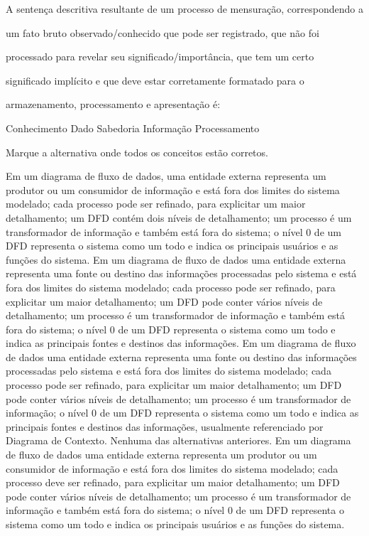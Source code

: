 \documentclass[12pt, addpoints]{exam}
\begin{document}
\begin{questions}
\question

A sentença descritiva resultante de um processo de mensuração, correspondendo a

um fato bruto observado/conhecido que pode ser registrado, que não foi

processado para revelar seu significado/importância, que tem um certo

significado implícito e que deve estar corretamente formatado para o

armazenamento, processamento e apresentação é:
\begin{choices}
\choice Conhecimento
\choice Dado
\choice Sabedoria
\choice Informação
\choice Processamento
\end{choices}

\question

Marque a alternativa onde todos os conceitos estão corretos.


\begin{choices}
\choice Em um diagrama de fluxo de dados, uma entidade externa representa um produtor ou um consumidor de informação e está fora dos limites do sistema modelado; cada processo pode ser refinado, para explicitar um maior detalhamento; um DFD contém dois níveis de detalhamento; um processo é um transformador de informação e também está fora do sistema; o nível 0 de um DFD representa o sistema como um todo e indica os principais usuários e as funções do sistema.
\choice Em um diagrama de fluxo de dados uma entidade externa representa uma fonte ou destino das informações processadas pelo sistema e está fora dos limites do sistema modelado; cada processo pode ser refinado, para explicitar um maior detalhamento; um DFD pode conter vários níveis de detalhamento; um processo é um transformador de informação e também está fora do sistema; o nível 0 de um DFD representa o sistema como um todo e indica as principais fontes e destinos das informações.
\choice Em um diagrama de fluxo de dados uma entidade externa representa uma fonte ou destino das informações processadas pelo sistema e está fora dos limites do sistema modelado; cada processo pode ser refinado, para explicitar um maior detalhamento; um DFD pode conter vários níveis de detalhamento; um processo é um transformador de informação; o nível 0 de um DFD representa o sistema como um todo e indica as principais fontes e destinos das informações, usualmente referenciado por Diagrama de Contexto.
\choice Nenhuma das alternativas anteriores.
\choice Em um diagrama de fluxo de dados uma entidade externa representa um produtor ou um consumidor de informação e está fora dos limites do sistema modelado; cada processo deve ser refinado, para explicitar um maior detalhamento; um DFD pode conter vários níveis de detalhamento; um processo é um transformador de informação e também está fora do sistema; o nível 0 de um DFD representa o sistema como um todo e indica os principais usuários e as funções do sistema.
\end{choices}


\end{questions}
\end{document}

